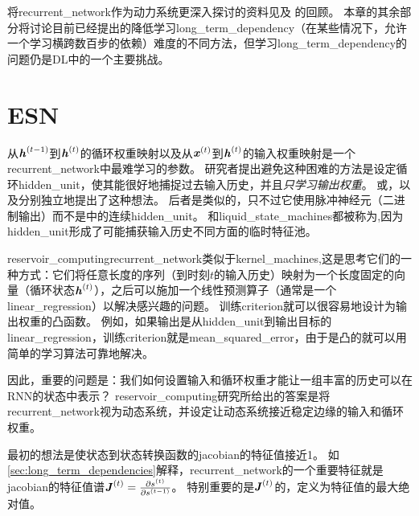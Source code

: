 将\gls{recurrent_network}作为动力系统更深入探讨的资料见\cite{Doya93,Bengio1994ITNN,Siegelmann+Sontag-1995}及
\cite{Pascanu-et-al-ICML2013}的回顾。
本章的其余部分将讨论目前已经提出的降低学习\gls{long_term_dependency}（在某些情况下，允许一个学习横跨数百步的依赖）难度的不同方法，但学习\gls{long_term_dependency}的问题仍是\gls{DL}中的一个主要挑战。


\section{\gls{ESN}}
\label{sec:echo_state_networks}
从$\boldsymbol{\mathit{h}}^{(t-1)}$到$\boldsymbol{\mathit{h}}^{(t)}$的循环权重映射以及从$\boldsymbol{\mathit{x}}^{(t)}$到$\boldsymbol{\mathit{h}}^{(t)}$的输入权重映射是一个\gls{recurrent_network}中最难学习的参数。
研究者\citep{Jaeger-NIPS2002,Maass-et-al-2002,Jaeger+Haas-2004}提出避免这种困难的方法是设定循环\gls{hidden_unit}，使其能很好地捕捉过去输入历史，并且\emph{只学习输出权重}。
或\citep{Jaeger+Haas-2004,Jaeger-2007}，以及\citep{Maass-et-al-2002}分别独立地提出了这种想法。
后者是类似的，只不过它使用脉冲神经元（二进制输出）而不是中的连续\gls{hidden_unit}。
和\gls{liquid_state_machines}都被称为\citep{Lukosevicius+Jaeger-2009},因为\gls{hidden_unit}形成了可能捕获输入历史不同方面的临时特征池。


\gls{reservoir_computing}\gls{recurrent_network}类似于\gls{kernel_machines},这是思考它们的一种方式：它们将任意长度的序列（到时刻$t$的输入历史）映射为一个长度固定的向量（循环状态$\boldsymbol{\mathit{h}}^{(t)}$），之后可以施加一个线性预测算子（通常是一个\gls{linear_regression}）以解决感兴趣的问题。
训练\gls{criterion}就可以很容易地设计为输出权重的凸函数。
例如，如果输出是从\gls{hidden_unit}到输出目标的\gls{linear_regression}，训练\gls{criterion}就是\gls{mean_squared_error}，由于是凸的就可以用简单的学习算法可靠地解决\citep{Jaeger-NIPS2002}。

因此，重要的问题是：我们如何设置输入和循环权重才能让一组丰富的历史可以在\gls{RNN}的状态中表示？
\gls{reservoir_computing}研究所给出的答案是将\gls{recurrent_network}视为动态系统，并设定让动态系统接近稳定边缘的输入和循环权重。

最初的想法是使状态到状态转换函数的\gls{jacobian}的特征值接近1。
如\ref{sec:long_term_dependencies}解释，\gls{recurrent_network}的一个重要特征就是\gls{jacobian}的特征值谱$\boldsymbol{\mathit{J}}^{(t)} = \frac{\partial s^{(t)}}{\partial s^{(t-1)}}$。
特别重要的是$\boldsymbol{\mathit{J}}^{(t)}$的，定义为特征值的最大绝对值。

